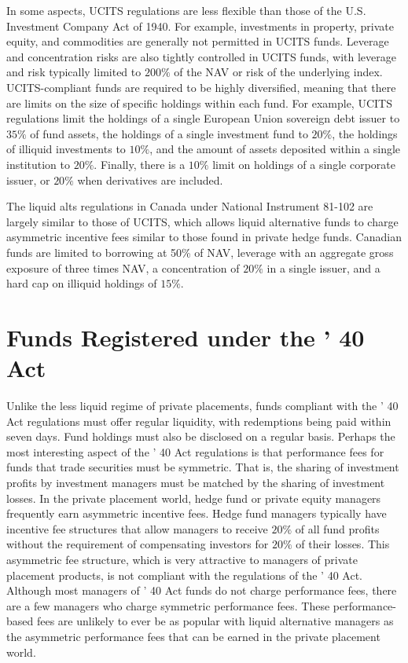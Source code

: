 \documentclass[11pt]{article}
\begin{document}
In some aspects, UCITS regulations are less flexible than those of the U.S. Investment Company Act of 1940. For example, investments in property, private equity, and commodities are generally not permitted in UCITS funds. Leverage and concentration risks are also tightly controlled in UCITS funds, with leverage and risk typically limited to $200 \%$ of the NAV or risk of the underlying index. UCITS-compliant funds are required to be highly diversified, meaning that there are limits on the size of specific holdings within each fund. For example, UCITS regulations limit the holdings of a single European Union sovereign debt issuer to $35 \%$ of fund assets, the holdings of a single investment fund to $20 \%$, the holdings of illiquid investments to $10 \%$, and the amount of assets deposited within a single institution to $20 \%$. Finally, there is a $10 \%$ limit on holdings of a single corporate issuer, or $20 \%$ when derivatives are included.

The liquid alts regulations in Canada under National Instrument 81-102 are largely similar to those of UCITS, which allows liquid alternative funds to charge asymmetric incentive fees similar to those found in private hedge funds. Canadian funds are limited to borrowing at 50\% of NAV, leverage with an aggregate gross exposure of three times NAV, a concentration of $20 \%$ in a single issuer, and a hard cap on illiquid holdings of $15 \%$.

\section*{Funds Registered under the ' 40 Act}
Unlike the less liquid regime of private placements, funds compliant with the ' 40 Act regulations must offer regular liquidity, with redemptions being paid within seven days. Fund holdings must also be disclosed on a regular basis. Perhaps the most interesting aspect of the ' 40 Act regulations is that performance fees for funds that trade securities must be symmetric. That is, the sharing of investment profits by investment managers must be matched by the sharing of investment losses. In the private placement world, hedge fund or private equity managers frequently earn asymmetric incentive fees. Hedge fund managers typically have incentive fee structures that allow managers to receive $20 \%$ of all fund profits without the requirement of compensating investors for $20 \%$ of their losses. This asymmetric fee structure, which is very attractive to managers of private placement products, is not compliant with the regulations of the ' 40 Act. Although most managers of ' 40 Act funds do not charge performance fees, there are a few managers who charge symmetric performance fees. These performance-based fees are unlikely to ever be as popular with liquid alternative managers as the asymmetric performance fees that can be earned in the private placement world.
\end{document}
